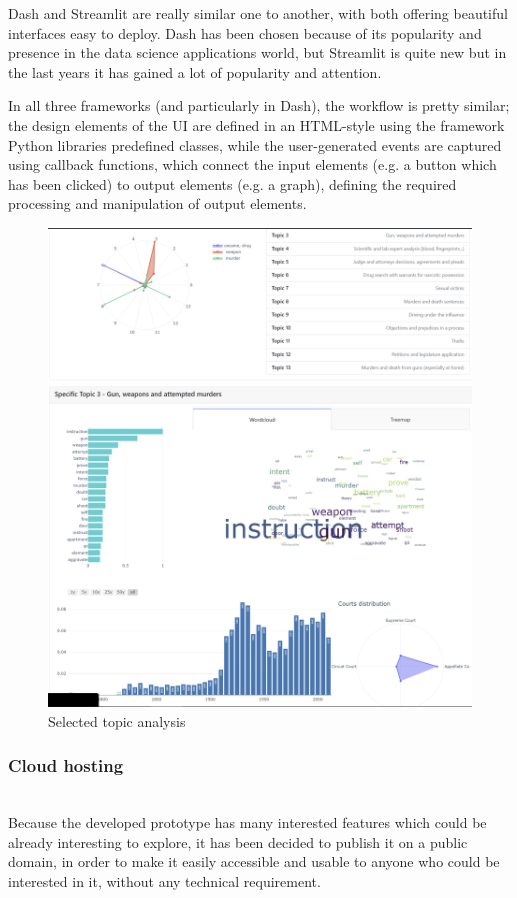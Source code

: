Dash and Streamlit are really similar one to another, with both offering beautiful interfaces easy to deploy. Dash has
been chosen because of its popularity and presence in the data science applications world, but Streamlit is quite new
but in the last years it has gained a lot of popularity and attention.

In all three frameworks (and particularly in Dash), the workflow is pretty similar; the design elements of the UI are
defined in an HTML-style using the framework Python libraries predefined classes, while the user-generated events are
captured using callback functions, which connect the input elements (e.g. a button which has been clicked) to output
elements (e.g. a graph), defining the required processing and manipulation of output elements.
\begin{figure}
\includegraphics[width=\textwidth]{images/webapp2.png}
\caption{Selected topic analysis} \label{fig5}
\end{figure}
\subsubsection{Cloud hosting}\hfill\\
Because the developed prototype has many interested features which could be already interesting to explore, it has been
decided to publish it on a public domain, in order to make it easily accessible and usable to anyone who could be
interested in it, without any technical requirement.

